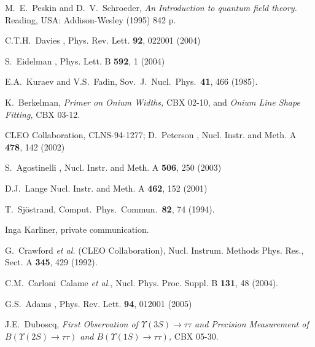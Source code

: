 \documentclass[aps,prd,preprint,superscriptaddress,tightenlines,nofootinbib,floatfix]{revtex4}
\begin{document}
%
%
\def\endpoint{;~~}
\def\Journal#1&#2&#3(#4){#1{\bf #2}, #3 (#4)}
\def\NIM{Nucl. Instr. and Meth. }
\def\NIMA{Nucl. Instr. and Meth. A }
\def\NPB{Nucl. Phys. B }
\def\PLB{Phys. Lett. B }
\def\PRL{Phys. Rev. Lett. }
\def\PRD{Phys. Rev. D }
\begin{thebibliography}{99}

 M.~E.~Peskin and D.~V.~Schroeder, {\it An Introduction to quantum field theory.} Reading, USA: Addison-Wesley (1995) 842 p.

 C.T.H.~Davies \etal, {\Journal\PRL&92&022001(2004)}

 S.~Eidelman \etal, {\Journal\PLB&592&1(2004)}

 E.A.~Kuraev and V.S.~Fadin, Sov.\ J.\ Nucl.\ Phys.\ {\bf 41}, 466 (1985).

 K.~Berkelman, {\it Primer on Onium Widths,} CBX 02-10, and {\it Onium Line Shape Fitting,} CBX 03-12.

 CLEO Collaboration, CLNS-94-1277; D.\ Peterson \etal, {\Journal\NIMA&478&142(2002)}

 S.~Agostinelli \etal, {\Journal\NIMA&506&250(2003)}

 D.J.~Lange {\Journal\NIMA&462&152(2001)}

 T.~Sj\"ostrand, Comput.\ Phys.\ Commun.\ {\bf 82}, 74 (1994).

 Inga Karliner, private communication.

 G.~Crawford {\it et al.} (CLEO Collaboration), Nucl. Instrum. Methods Phys. Res., Sect. A {\bf 345}, 429 (1992).

 C.M.~Carloni~Calame {\sl et al.}, Nucl. Phys. Proc. Suppl. B {\bf 131}, 48 (2004).

 G.S.~Adams \etal, {\Journal\PRL&94&012001(2005)}

 J.E.~Duboscq, {\it First Observation of $\Upsilon(3S) \to \tau\tau$ and Precision Measurement of $B(\Upsilon(2S) \to \tau\tau)$ and $B(\Upsilon(1S) \to \tau\tau)$,} CBX 05-30.

\end{thebibliography}
\end{document}
